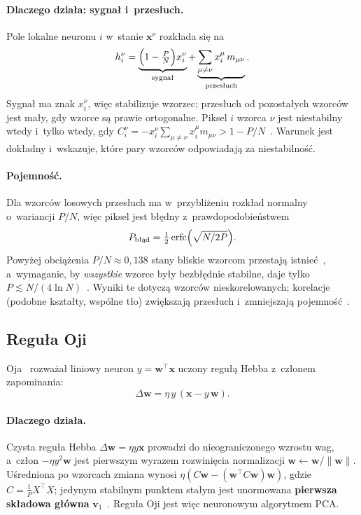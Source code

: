 \documentclass[11pt,a4paper]{article}
\newcommand{\vx}{\mathbf{x}}
\newcommand{\vw}{\mathbf{w}}
\newcommand{\vv}{\mathbf{v}}
\begin{document}
\paragraph{Dlaczego działa: sygnał i~przesłuch.}
Pole lokalne neuronu $i$ w~stanie $\vx^\nu$ rozkłada się na
\begin{equation}
  h_i^\nu = \underbrace{\Bigl(1-\tfrac PN\Bigr) x_i^\nu}_{\text{sygnał}}
  + \underbrace{\sum_{\mu\ne\nu} x_i^\mu\, m_{\mu\nu}}_{\text{przesłuch}} .
\end{equation}
Sygnał ma znak $x_i^\nu$, więc stabilizuje wzorzec; przesłuch od pozostałych wzorców jest mały,
gdy wzorce są prawie ortogonalne. Piksel $i$ wzorca $\nu$ jest niestabilny wtedy i~tylko wtedy,
gdy $C_i^\nu=-x_i^\nu\sum_{\mu\ne\nu}x_i^\mu m_{\mu\nu}>1-P/N$~\cite{hertz1991}. Warunek jest
dokładny i~wskazuje, które pary wzorców odpowiadają za niestabilność.

\paragraph{Pojemność.}
Dla wzorców losowych przesłuch ma w~przybliżeniu rozkład normalny o~wariancji $P/N$, więc
piksel jest błędny z~prawdopodobieństwem
\begin{equation}
  P_\text{błąd} = \tfrac12\operatorname{erfc}\Bigl(\sqrt{N/2P}\Bigr).
  \label{eq:perr}
\end{equation}
Powyżej obciążenia $P/N\approx0{,}138$ stany bliskie wzorcom przestają istnieć~\cite{amit1985},
a~wymaganie, by \emph{wszystkie} wzorce były bezbłędnie stabilne, daje tylko
$P\lesssim N/(4\ln N)$~\cite{mceliece1987}. Wyniki te dotyczą wzorców nieskorelowanych;
korelacje (podobne kształty, wspólne tło) zwiększają przesłuch i~zmniejszają
pojemność~\cite{lowe1998}.

\subsection{Reguła Oji}
\label{sec:oja}
Oja~\cite{oja1982} rozważał liniowy neuron $y=\vw^\top\vx$ uczony regułą Hebba z~członem
zapominania:
\begin{equation}
  \Delta\vw = \eta\, y\,(\vx - y\,\vw).
  \label{eq:oja}
\end{equation}
\paragraph{Dlaczego działa.}
Czysta reguła Hebba $\Delta\vw=\eta y\vx$ prowadzi do nieograniczonego wzrostu wag, a~człon
$-\eta y^2\vw$ jest pierwszym wyrazem rozwinięcia normalizacji $\vw\leftarrow\vw/\lVert\vw\rVert$.
Uśredniona po wzorcach zmiana wynosi $\eta(C\vw-(\vw^\top C\vw)\vw)$, gdzie $C=\frac1P X^\top X$;
jedynym stabilnym punktem stałym jest unormowana \textbf{pierwsza składowa główna}
$\vv_1$~\cite{oja1982}. Reguła Oji jest więc neuronowym algorytmem PCA.
\end{document}
